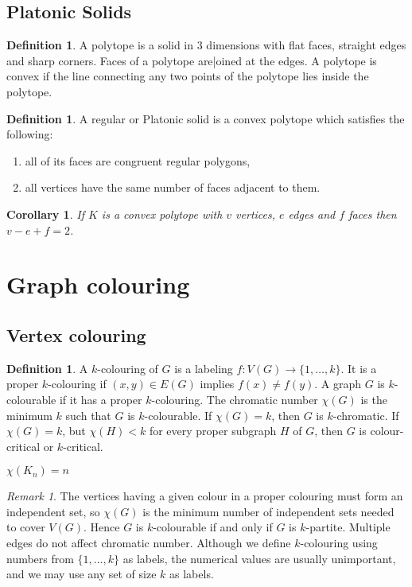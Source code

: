 \documentclass[11pt, fleqn, a4paper, landscape]{article}
\theoremstyle{plain} %
\newtheorem{cor}[thm]{Corollary}
\theoremstyle{remark} %
\newtheorem{rem}[thm]{Remark}
\theoremstyle{definition} %
\newtheorem{defi}[thm]{Definition}
\begin{document}
\begin{multicols}{3}
\subsection{Platonic Solids}

\begin{defi}
A polytope is a solid in 3 dimensions with flat faces, straight edges and sharp corners. Faces of a polytope are|oined at the edges. A polytope is convex if the line connecting any two points of the polytope lies inside the polytope.
\end{defi}
\addtocounter{thm}{1}
\begin{defi}
A regular or Platonic solid is a convex polytope which satisfies the following:
\begin{enumerate}
\item all of its faces are congruent regular polygons,
\item all vertices have the same number of faces adjacent to them.
\end{enumerate}
\end{defi}
 
\begin{cor}
If $K$ is a convex polytope with $v$ vertices, $e$ edges and $f$ faces then $v - e + f = 2$.
\end{cor}

\section{Graph colouring}
\subsection{Vertex colouring}

\begin{defi}
A $k$-colouring of $G$ is a labeling $f : V (G) \to \{1, \dots , k\}$. It is a proper $k$-colouring if $(x, y) \in E(G)$ implies $f(x) \ne f(y)$. A graph $G $ is $k$-colourable if it has a proper $k$-colouring. The
chromatic number $\chi(G)$ is the minimum $k$ such that $G$ is $k$-colourable. If $\chi(G) = k$, then $G$ is
$k$-chromatic. If $\chi(G) = k$, but $\chi(H) < k$ for every proper subgraph $H$ of $G$, then $G$ is colour-critical or $k$-critical.

$\chi(K_n) = n$
\end{defi}
\addtocounter{thm}{1}
\begin{rem}
The vertices having a given colour in a proper colouring must form an independent set, so $\chi(G)$ is the minimum number of independent sets needed to cover $V (G).$ Hence $G$ is $k$-colourable if and only if $G$ is $k$-partite. Multiple edges do not affect chromatic number. Although we define
$k$-colouring using numbers from $\{1, \dots , k\}$ as labels, the numerical values are usually unimportant, and we may use any set of size $k$ as labels.
\end{rem}


\end{multicols}
\end{document}
